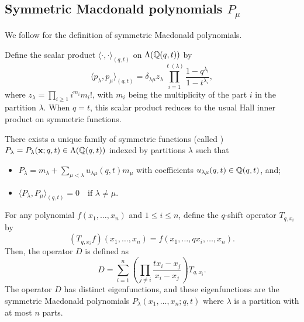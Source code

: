\subsection{Symmetric Macdonald polynomials \texorpdfstring{\(P_\mu\)}{Pμ}}

We follow \cite[Chapter VI]{Mac96} for the definition of symmetric Macdonald polynomials.

Define the scalar product \(\langle \cdot, \cdot \rangle_{(q, t)}\) on \(\Lambda(\mathbb{Q}(q, t))\) by
\begin{equation*}
	\langle p_\lambda, p_\mu \rangle_{(q, t)} = \delta_{\lambda\mu} z_\lambda \prod_{i=1}^{\ell(\lambda)} \frac{1 - q^{\lambda_i}}{1 - t^{\lambda_i}},
\end{equation*}
where \( z_\lambda = \prod_{i \geq 1} i^{m_i} m_i!\), with \(m_i\) being the multiplicity of the part \(i\) in the partition \(\lambda\).
When \(q = t\), this scalar product reduces to the usual Hall inner product on symmetric functions.

\begin{theorem}
	There exists a unique family of symmetric functions (called ) \(P_\lambda = P_\lambda(\mathbf{x}; q, t) \in \Lambda(\mathbb{Q}(q, t))\) indexed by partitions \(\lambda\) such that
	\begin{itemize}
		\item \( P_\lambda = m_\lambda + \sum_{\mu < \lambda} u_{\lambda\mu}(q, t) m_\mu \) with coefficients \( u_{\lambda\mu}(q, t) \in \mathbb{Q}(q, t) \), and;
		\item \( \langle P_\lambda, P_\mu \rangle_{(q, t)} = 0 \quad \text{if } \lambda \ne \mu \).
	\end{itemize}
\end{theorem}

For any polynomial \( f(x_1, \ldots, x_n) \) and \(1 \le i \le n\), define the \(q\)-shift operator \(T_{q,x_i}\) by
\begin{equation*}
	(T_{q,x_i} f)(x_1, \ldots, x_n) = f(x_1, \ldots, qx_i, \ldots, x_n).
\end{equation*}
Then, the operator \( D \) is defined as
\begin{equation*}
	D = \sum_{i=1}^n \left( \prod_{j \ne i} \frac{t x_i - x_j}{x_i - x_j} \right) T_{q,x_i}.
\end{equation*}
The operator \(D\) has distinct eigenfunctions, and these eigenfunctions are the symmetric Macdonald polynomials \(P_\lambda(x_1, \ldots, x_n; q, t)\) where \(\lambda\) is a partition with at most \(n\) parts.

